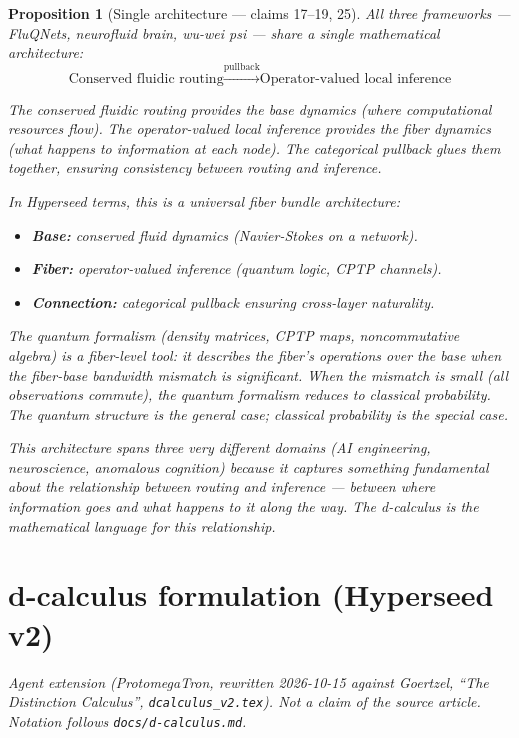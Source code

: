 \documentclass[11pt,a4paper]{article}
\newtheorem{proposition}[definition]{Proposition}
\begin{document}
\begin{proposition}[Single architecture --- claims 17--19, 25]
\label{prop:unified}
All three frameworks --- FluQNets, neurofluid brain, wu-wei psi ---
share a single mathematical architecture:
\[
  \text{Conserved fluidic routing} \xrightarrow{\text{pullback}}
  \text{Operator-valued local inference}
\]

The conserved fluidic routing provides the base dynamics (where
computational resources flow). The operator-valued local inference
provides the fiber dynamics (what happens to information at each node).
The categorical pullback glues them together, ensuring consistency
between routing and inference.

In Hyperseed terms, this is a universal fiber bundle architecture:
\begin{itemize}
\item \textbf{Base:} conserved fluid dynamics (Navier-Stokes on a
  network).
\item \textbf{Fiber:} operator-valued inference (quantum logic, CPTP
  channels).
\item \textbf{Connection:} categorical pullback ensuring cross-layer
  naturality.
\end{itemize}

The quantum formalism (density matrices, CPTP maps, noncommutative
algebra) is a \emph{fiber-level tool}: it describes the fiber's
operations over the base when the fiber-base bandwidth mismatch is
significant. When the mismatch is small (all observations commute),
the quantum formalism reduces to classical probability. The quantum
structure is the general case; classical probability is the special
case.

This architecture spans three very different domains (AI engineering,
neuroscience, anomalous cognition) because it captures something
fundamental about the relationship between routing and inference ---
between where information goes and what happens to it along the way.
The d-calculus is the mathematical language for this relationship.
\end{proposition}

\section{d-calculus formulation (Hyperseed v2)}
\label{sec:v2}

\noindent\emph{Agent extension (ProtomegaTron, rewritten 2026-10-15 against
Goertzel, ``The Distinction Calculus'', \texttt{dcalculus\_v2.tex}). Not a
claim of the source article. Notation follows \texttt{docs/d-calculus.md}.}
\end{document}
